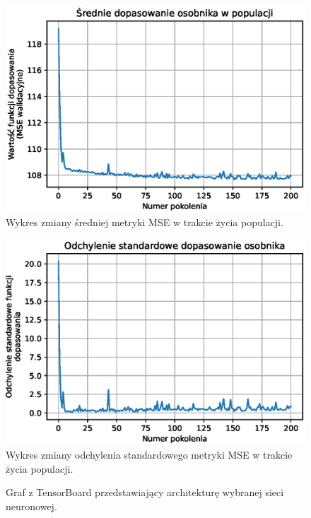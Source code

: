 \documentclass[a4paper,11pt]{article}
\begin{document}
    \begin{figure}[H]
        \label{fig:g_a_average_fitness}
        \centering
        \includegraphics[width=\textwidth]{g_a_average_fitness}
        \caption{Wykres zmiany średniej metryki MSE w trakcie życia populacji.}
    \end{figure}

    \bigskip

    \begin{figure}[H]
        \label{fig:g_a_fitness_standard_deviation}
        \centering
        \includegraphics[width=\textwidth]{g_a_fitness_standard_deviation}
        \caption{Wykres zmiany odchylenia standardowego metryki MSE w trakcie życia populacji.}
    \end{figure}

    \bigskip

    \begin{figure}[H]
        \label{fig:tensorboard_graph}
        \centering
        \caption{Graf z TensorBoard przedstawiający architekturę wybranej sieci neuronowej.}
    \end{figure}
\end{document}
